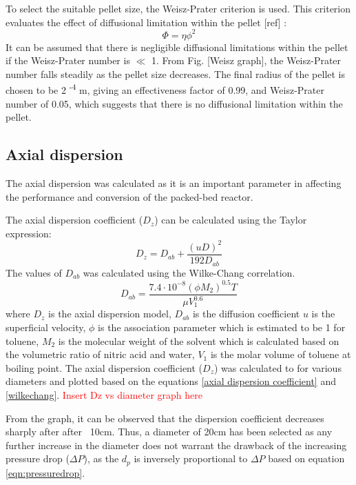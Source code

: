 To select the suitable pellet size, the Weisz-Prater criterion is used. This criterion evaluates the effect of diffusional limitation within the pellet [ref] :
\begin{equation}
    \Phi = \eta \phi^2
\end{equation}
It can be assumed that there is negligible diffusional limitations within the pellet if the Weisz-Prater number is $\ll$ 1. From Fig. [Weisz graph], the Weisz-Prater number falls steadily as the pellet size decreases. The final radius of the pellet is chosen to be 2 \textsuperscript{-4} m, giving an effectiveness factor of 0.99, and Weisz-Prater number of 0.05, which suggests that there is no diffusional limitation within the pellet.


\subsection{Axial dispersion}
\label{sec:axialdispersion}
The axial dispersion was calculated as it is an important parameter in affecting the performance and conversion of the packed-bed reactor. 

The axial dispersion coefficient ($D_z$) can be calculated using the Taylor expression: 
\begin{equation}
    D_z=D_{ab}+\frac{(uD)^2}{192D_{ab}}
    \label{axial dispersion coefficient}
\end{equation}
The values of $D_{ab}$ was calculated using the Wilke-Chang correlation.
\begin{equation}
    D_{ab}=\frac{7.4\cdot 10^{-8}(\phi M_2)^{0.5}T}{\mu V_1^{0.6}}
    \label{wilkechang}
\end{equation}
where $D_z$ is the axial dispersion model, $D_{ab}$ is the diffusion coefficient $u$ is the superficial velocity, $\phi$ is the association parameter which is estimated to be 1 for toluene, $M_2$ is the molecular weight of the solvent which is calculated based on the volumetric ratio of nitric acid and water, $V_1$ is the molar volume of toluene at boiling point.
The axial dispersion coefficient ($D_z$) was calculated to for various diameters and plotted based on the equations \ref{axial dispersion coefficient} and \ref{wilkechang}.
\textcolor{red}{Insert Dz vs diameter graph here} 


From the graph, it can be observed that the dispersion coefficient decreases sharply after after ~10cm. Thus, a diameter of 20cm has been selected as any further increase in the diameter does not warrant the drawback of the increasing pressure drop ($\Delta P$), as the $d_p$ is inversely proportional to $\Delta P$ based on equation \ref{eqn:pressuredrop}.
